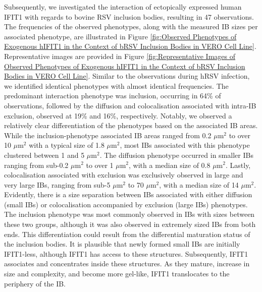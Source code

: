 Subsequently, we investigated the interaction of ectopically expressed human IFIT1 with regards to bovine RSV inclusion bodies, resulting in 47 observations. The frequencies of the observed phenotypes, along with the measured IB sizes per associated phenotype, are illustrated in Figure \ref{fig:Observed Phenotypes of Exogenous hIFIT1 in the Context of bRSV Inclusion Bodies in VERO Cell Line}. Representative images are provided in Figure \ref{fig:Representative Images of Observed Phenotypes of Exogenous hIFIT1 in the Context of bRSV Inclusion Bodies in VERO Cell Line}. Similar to the observations during hRSV infection, we identified identical phenotypes with almost identical frequencies. The predominant interaction phenotype was inclusion, occurring in 64\% of observations, followed by the diffusion and colocalisation associated with intra-IB exclusion, observed at 19\% and 16\%, respectively. Notably, we observed a relatively clear differentiation of the phenotypes based on the associated IB areas. While the inclusion-phenotype associated IB areas ranged from 0.2 \(\mu \mbox{m}^2\) to over 10 \(\mu \mbox{m}^2\) with a typical size of 1.8 \(\mu \mbox{m}^2\), most IBs associated with this phenotype clustered between 1 and 5 \(\mu \mbox{m}^2\). The diffusion phenotype occurred in smaller IBs ranging from sub-0.2 \(\mu \mbox{m}^2\) to over 1 \(\mu \mbox{m}^2\), with a median size of 0.8 \(\mu \mbox{m}^2\). Lastly, colocalisation associated with exclusion was exclusively observed in large and very large IBs, ranging from sub-5 \(\mu \mbox{m}^2\) to 70 \(\mu \mbox{m}^2\), with a median size of 14 \(\mu \mbox{m}^2\). Evidently, there is a size separation between IBs associated with either diffusion (small IBs) or colocalisation accompanied by exclusion (large IBs) phenotypes. The inclusion phenotype was most commonly observed in IBs with sizes between these two groups, although it was also observed in extremely sized IBs from both ends. This differentiation could result from the differential maturation status of the inclusion bodies. It is plausible that newly formed small IBs are initially IFIT1-less, although IFIT1 has access to these structures. Subsequently, IFIT1 associates and concentrates inside these structures. As they mature, increase in size and complexity, and become more gel-like, IFIT1 translocates to the periphery of the IB.


